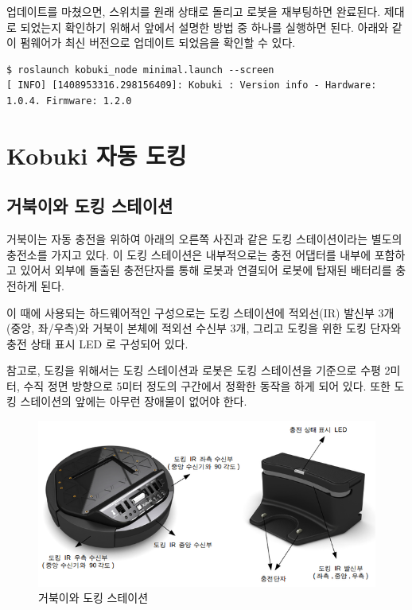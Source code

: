 업데이트를 마쳤으면, 스위치를 원래 상태로 돌리고 로봇을 재부팅하면 완료된다. 제대로 되었는지 확인하기 위해서 앞에서 설명한 방법 중 하나를 실행하면 된다. 아래와 같이 펌웨어가 최신 버전으로 업데이트 되었음을 확인할 수 있다.

\vspace{\baselineskip}
\begin{lstlisting}[language=ROS]
$ roslaunch kobuki_node minimal.launch --screen
[ INFO] [1408953316.298156409]: Kobuki : Version info - Hardware: 1.0.4. Firmware: 1.2.0
\end{lstlisting}

\section{Kobuki 자동 도킹}

\subsection{거북이와 도킹 스테이션}

거북이는 자동 충전을 위하여 아래의 오른쪽 사진과 같은 도킹 스테이션이라는 별도의 충전소를 가지고 있다. 이 도킹 스테이션은 내부적으로는 충전 어댑터를 내부에 포함하고 있어서 외부에 돌출된 충전단자를 통해 로봇과 연결되어 로봇에 탑재된 배터리를 충전하게 된다.

이 때에 사용되는 하드웨어적인 구성으로는 도킹 스테이션에 적외선(IR) 발신부 3개 (중앙, 좌/우측)와 거북이 본체에 적외선 수신부 3개, 그리고 도킹을 위한 도킹 단자와 충전 상태 표시 LED 로 구성되어 있다.

참고로, 도킹을 위해서는 도킹 스테이션과 로봇은 도킹 스테이션을 기준으로 수평 2미터, 수직 정면 방향으로 5미터 정도의 구간에서 정확한 동작을 하게 되어 있다. 또한 도킹 스테이션의 앞에는 아무런 장애물이 없어야 한다.

\begin{figure}[h]
\centering\includegraphics[width=0.8\columnwidth]{pictures/chapter10/kobuki_docking_station.png}
\caption{거북이와 도킹 스테이션}
\end{figure}

